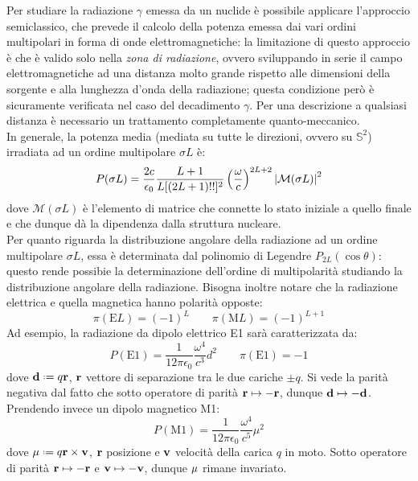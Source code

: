 Per studiare la radiazione $ \gamma $ emessa da un nuclide è possibile applicare l'approccio semiclassico, che prevede il calcolo della potenza emessa dai vari ordini multipolari in forma di onde elettromagnetiche: la limitazione di questo approccio è che è valido solo nella \textit{zona di radiazione}, ovvero sviluppando in serie il campo elettromagnetiche ad una distanza molto grande rispetto alle dimensioni della sorgente e alla lunghezza d'onda della radiazione; questa condizione però è sicuramente verificata nel caso del decadimento $ \gamma $. Per una descrizione a qualsiasi distanza è necessario un trattamento completamente quanto-meccanico.\\
In generale, la potenza media (mediata su tutte le direzioni, ovvero su $ \mathbb{S}^2 $) irradiata ad un ordine multipolare $ \sigma L $ è:
\begin{equation}
	P(\sigma L) = \frac{2c}{\epsilon_0} \frac{L + 1}{L [(2L + 1)!!]^2} \left( \frac{\omega}{c} \right)^{2L + 2} \left\lvert\mathcal{M}(\sigma L)\right\rvert^2
	\label{eq:2.41}
\end{equation}
dove $ \mathcal{M}(\sigma L) $ è l'elemento di matrice che connette lo stato iniziale a quello finale e che dunque dà la dipendenza dalla struttura nucleare.\\
Per quanto riguarda la distribuzione angolare della radiazione ad un ordine multipolare $ \sigma L $, essa è determinata dal polinomio di Legendre $ P_{2L}(\cos \theta) $: questo rende possibie la determinazione dell'ordine di multipolarità studiando la distribuzione angolare della radiazione. Bisogna inoltre notare che la radiazione elettrica e quella magnetica hanno polarità opposte:
\begin{equation}
	\pi(\text{E}L) = (-1)^{L} \qquad \pi(\text{M}L) = (-1)^{L + 1}
	\label{eq:2.42}
\end{equation}
Ad esempio, la radiazione da dipolo elettrico E1 sarà caratterizzata da:
\begin{equation*}
	P(\text{E}1) = \frac{1}{12\pi \epsilon_0} \frac{\omega^4}{c^3} d^2 \qquad \pi(\text{E}1) = -1
\end{equation*}
dove $ \ve{d} \defeq q\ve{r} $, $ \mathbf{r} $ vettore di separazione tra le due cariche $ \pm q $. Si vede la parità negativa dal fatto che sotto operatore di parità $ \mathbf{r} \mapsto -\mathbf{r} $, dunque $ \mathbf{d} \mapsto -\mathbf{d} $.\\
Prendendo invece un dipolo magnetico M1:
\begin{equation*}
	P(\text{M}1) = \frac{1}{12\pi \epsilon_0} \frac{\omega^4}{c^5} \mu^2
\end{equation*}
dove $ \ve{\mu} \defeq q \ve{r}\times\ve{v} $, $ \mathbf{r} $ posizione e $ \mathbf{v} $ velocità della carica $ q $ in moto. Sotto operatore di parità $ \mathbf{r} \mapsto -\mathbf{r} $ e $ \mathbf{v} \mapsto -\mathbf{v} $, dunque $ \mathbf{\mu} $ rimane invariato.

